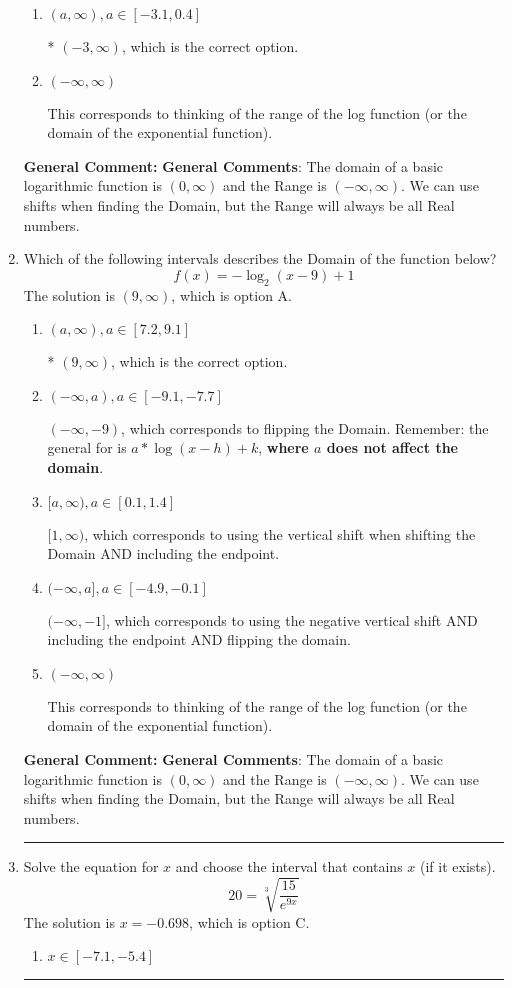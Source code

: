 \documentclass{extbook}[14pt]
\newcommand{\litem}[1]{\item #1

\rule{\textwidth}{0.4pt}}
\begin{document}
\begin{enumerate}
{\begin{enumerate}[label=\Alph*.]
$(-\infty, -8]$, which corresponds to using the negative vertical shift AND including the endpoint AND flipping the domain.
\item \( (a, \infty), a \in [-3.1, 0.4] \)

* $(-3, \infty)$, which is the correct option.
\item \( (-\infty, \infty) \)

This corresponds to thinking of the range of the log function (or the domain of the exponential function).
\end{enumerate}

\textbf{General Comment:} \textbf{General Comments}: The domain of a basic logarithmic function is $(0, \infty)$ and the Range is $(-\infty, \infty)$. We can use shifts when finding the Domain, but the Range will always be all Real numbers.
}
\litem{
Which of the following intervals describes the Domain of the function below?
\[ f(x) = -\log_2{(x-9)}+1 \]The solution is \( (9, \infty) \), which is option A.\begin{enumerate}[label=\Alph*.]
\item \( (a, \infty), a \in [7.2, 9.1] \)

* $(9, \infty)$, which is the correct option.
\item \( (-\infty, a), a \in [-9.1, -7.7] \)

$(-\infty, -9)$, which corresponds to flipping the Domain. Remember: the general for is $a*\log(x-h)+k$, \textbf{where $a$ does not affect the domain}.
\item \( [a, \infty), a \in [0.1, 1.4] \)

$[1, \infty)$, which corresponds to using the vertical shift when shifting the Domain AND including the endpoint.
\item \( (-\infty, a], a \in [-4.9, -0.1] \)

$(-\infty, -1]$, which corresponds to using the negative vertical shift AND including the endpoint AND flipping the domain.
\item \( (-\infty, \infty) \)

This corresponds to thinking of the range of the log function (or the domain of the exponential function).
\end{enumerate}

\textbf{General Comment:} \textbf{General Comments}: The domain of a basic logarithmic function is $(0, \infty)$ and the Range is $(-\infty, \infty)$. We can use shifts when finding the Domain, but the Range will always be all Real numbers.
}
\litem{
 Solve the equation for $x$ and choose the interval that contains $x$ (if it exists).
\[  20 = \sqrt[3]{\frac{15}{e^{9x}}} \]The solution is \( x = -0.698 \), which is option C.\begin{enumerate}[label=\Alph*.]
\item \( x \in [-7.1, -5.4] \)


\end{enumerate}}
\end{enumerate}
\end{document}
